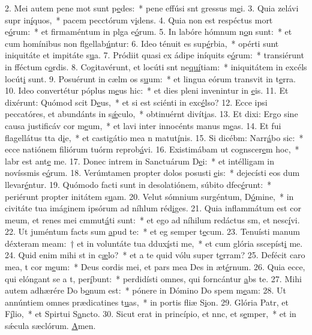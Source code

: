 2. Mei autem pene mot sunt p\uline{e}des:~* pene effúsi snt gressus m\uline{e}i.
3. Quia zelávi supr in\uline{í}quos,~* pacem pecctórum v\uline{i}dens.
4. Quia non est respéctus mort e\uline{ó}rum:~* et firmaméntum in plga e\uline{ó}rum.
5. In labóre hómnum n\uline{o}n sunt:~* et cum homínibus non flgellab\uline{ú}ntur:
6. Ideo ténuit es sup\uline{é}rbia,~* opérti sunt iniquitáte et impitáte s\uline{u}a.
7. Pródiit quasi ex ádipe iníquits e\uline{ó}rum:~* transiérunt in fféctum c\uline{o}rdis.
8. Cogitavérunt, et locúti snt ne\uline{quí}tiam:~* iniquitátem in excéls locút\uline{i} sunt.
9. Posuérunt in cælm os s\uline{u}um:~* et lingua eórum transvit in t\uline{e}rra.
10. Ideo convertétur póplus m\uline{e}us hic:~* et dies pleni invenintur in \uline{e}is.
11. Et dixérunt: Quómod scit D\uline{e}us,~* et si est sciénti in exc\uline{é}lso?
12. Ecce ipsi peccatóres, et abundánts in s\uline{ǽ}culo,~* obtinuérnt divít\uline{i}as.
13. Et dixi: Ergo sine causa justificáv cor m\uline{e}um,~* et lavi inter innocénts manus m\uline{e}as.
14. Et fui flagellátus tta d\uline{i}e,~* et castigátio mea n matut\uline{í}nis.
15. Si dicébm: Narr\uline{á}bo sic:~* ecce natiónem filiórum tuórm reprob\uline{á}vi.
16. Existimábam ut cognscer\uline{e}m hoc,~* labr est ant\uline{e} me.
17. Donec intrem in Sanctuárum D\uline{e}i:~* et intélligam in novíssmis e\uline{ó}rum.
18. Verúmtamen propter dolos posusti \uline{e}is:~* dejecísti eos dum llevar\uline{é}ntur.
19. Quómodo facti sunt in desolatiónem, súbito dfec\uline{é}runt:~* periérunt propter initátem s\uline{u}am.
20. Velut sómnium surgéntum, D\uline{ó}mine,~* in civitáte tua imáginem ipsórum ad níhlum réd\uline{i}ges.
21. Quia inflammátum est cor meum, et renes mei cmmut\uline{á}ti sunt:~* et ego ad níhilum redáctus sm, et nesc\uline{í}vi.
22. Ut juméntum facts sum \uline{a}pud te:~* et eg semper t\uline{e}cum.
23. Tenuísti manum déxteram meam:~† et in voluntáte tua ddux\uline{í}sti me,~* et cum glória sscepíst\uline{i} me.
24. Quid enim mihi st in c\uline{æ}lo?~* et a te quid vólu super t\uline{e}rram?
25. Defécit caro mea, t cor m\uline{e}um:~* Deus cordis mei, et pars mea Des in æt\uline{é}rnum.
26. Quia ecce, qui elóngant se a t, per\uline{í}bunt:~* perdidísti omnes, qui forncántur \uline{a}bs te.
27. Mihi autem adhærére Do b\uline{o}num est:~* pónere in Dómino Do spem m\uline{e}am:
28. Ut annúntiem omnes prædicatines t\uline{u}as,~* in portis fliæ S\uline{i}on.
29. Glória Patr, et F\uline{í}lio,~* et Spirtui S\uline{a}ncto.
30. Sicut erat in princípio, et nnc, et s\uline{e}mper,~* et in sǽcula sæclórum. \uline{A}men.
